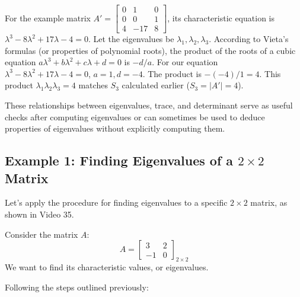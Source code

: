 \documentclass{article}
\begin{document}
\begin{itemize}
    For the example matrix $A' = \begin{bmatrix} 0 & 1 & 0 \\ 0 & 0 & 1 \\ 4 & -17 & 8 \end{bmatrix}$, its characteristic equation is $\lambda^3 - 8\lambda^2 + 17\lambda - 4 = 0$. Let the eigenvalues be $\lambda_1, \lambda_2, \lambda_3$. According to Vieta's formulas (or properties of polynomial roots), the product of the roots of a cubic equation $a\lambda^3 + b\lambda^2 + c\lambda + d=0$ is $-d/a$. For our equation $\lambda^3 - 8\lambda^2 + 17\lambda - 4=0$, $a=1, d=-4$. The product is $-(-4)/1 = 4$. This product $\lambda_1 \lambda_2 \lambda_3 = 4$ matches $S_3$ calculated earlier ($S_3 = |A'| = 4$).

\end{itemize}

These relationships between eigenvalues, trace, and determinant serve as useful checks after computing eigenvalues or can sometimes be used to deduce properties of eigenvalues without explicitly computing them.


\subsection{Example 1: Finding Eigenvalues of a $2 \times 2$ Matrix} %

Let's apply the procedure for finding eigenvalues to a specific $2 \times 2$ matrix, as shown in Video 35.

Consider the matrix $A$:
\[ A = \begin{bmatrix} 3 & 2 \\ -1 & 0 \end{bmatrix}_{2 \times 2} \]
We want to find its characteristic values, or eigenvalues.

Following the steps outlined previously:
\end{document}
